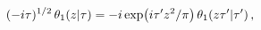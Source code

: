 \[(-i\tau)^{1/2}\mathop{\theta_{1}\/}\nolimits\!\left(z\middle|\tau\right)=-i%
\mathop{\exp\/}\nolimits\!\left(i\tau^{\prime}z^{2}/\pi\right)\mathop{\theta_{%
1}\/}\nolimits\!\left(z\tau^{\prime}\middle|\tau^{\prime}\right),\]